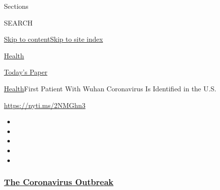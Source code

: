 Sections

SEARCH

\protect\hyperlink{site-content}{Skip to
content}\protect\hyperlink{site-index}{Skip to site index}

\href{https://www.nytimes3xbfgragh.onion/section/health}{Health}

\href{https://myaccount.nytimes3xbfgragh.onion/auth/login?response_type=cookie\&client_id=vi}{}

\href{https://www.nytimes3xbfgragh.onion/section/todayspaper}{Today's
Paper}

\href{/section/health}{Health}\textbar{}First Patient With Wuhan
Coronavirus Is Identified in the U.S.

\url{https://nyti.ms/2NMGhn3}

\begin{itemize}
\item
\item
\item
\item
\item
\end{itemize}

\hypertarget{the-coronavirus-outbreak}{%
\subsubsection{\texorpdfstring{\href{https://www.nytimes3xbfgragh.onion/news-event/coronavirus?name=styln-coronavirus-national\&region=TOP_BANNER\&block=storyline_menu_recirc\&action=click\&pgtype=Article\&impression_id=52372080-f288-11ea-87c3-11143d5ed90a\&variant=undefined}{The
Coronavirus
Outbreak}}{The Coronavirus Outbreak}}\label{the-coronavirus-outbreak}}

